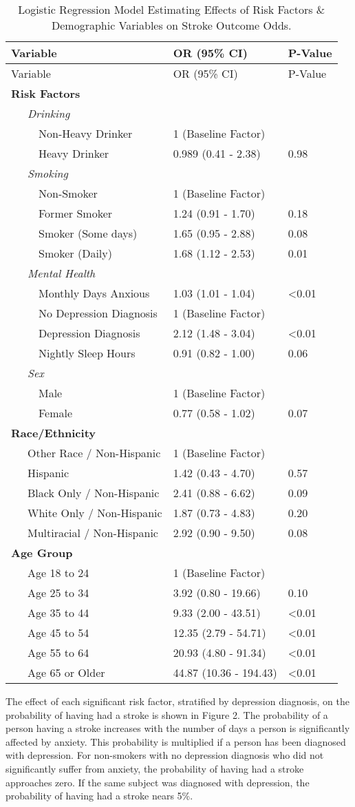 \documentclass[11pt,]{article}
\begin{document}
\begin{longtable}[]{@{}lll@{}}
\caption{Logistic Regression Model Estimating Effects of Risk Factors \&
Demographic Variables on Stroke Outcome Odds.}\tabularnewline
\toprule
Variable & OR (95\% CI) & P-Value\tabularnewline
\midrule
\endfirsthead
\toprule
Variable & OR (95\% CI) & P-Value\tabularnewline
\midrule
\endhead
\textbf{Risk Factors} & &\tabularnewline
~~~\emph{Drinking} & &\tabularnewline
~~~~~Non-Heavy Drinker & 1 (Baseline Factor) &\tabularnewline
~~~~~Heavy Drinker & 0.989 (0.41 - 2.38) & 0.98\tabularnewline
~~~\emph{Smoking} & &\tabularnewline
~~~~~Non-Smoker & 1 (Baseline Factor) &\tabularnewline
~~~~~Former Smoker & 1.24 (0.91 - 1.70) & 0.18\tabularnewline
~~~~~Smoker (Some days) & 1.65 (0.95 - 2.88) & 0.08\tabularnewline
~~~~~Smoker (Daily) & 1.68 (1.12 - 2.53) & 0.01\tabularnewline
~~~\emph{Mental Health} & &\tabularnewline
~~~~~Monthly Days Anxious & 1.03 (1.01 - 1.04) &
\textless{}0.01\tabularnewline
~~~~~No Depression Diagnosis & 1 (Baseline Factor) &\tabularnewline
~~~~~Depression Diagnosis & 2.12 (1.48 - 3.04) &
\textless{}0.01\tabularnewline
~~~~~Nightly Sleep Hours & 0.91 (0.82 - 1.00) & 0.06\tabularnewline
~~~\emph{Sex} & &\tabularnewline
~~~~~Male & 1 (Baseline Factor) &\tabularnewline
~~~~~Female & 0.77 (0.58 - 1.02) & 0.07\tabularnewline
\textbf{Race/Ethnicity} & &\tabularnewline
~~~Other Race / Non-Hispanic & 1 (Baseline Factor) &\tabularnewline
~~~Hispanic & 1.42 (0.43 - 4.70) & 0.57\tabularnewline
~~~Black Only / Non-Hispanic & 2.41 (0.88 - 6.62) & 0.09\tabularnewline
~~~White Only / Non-Hispanic & 1.87 (0.73 - 4.83) & 0.20\tabularnewline
~~~Multiracial / Non-Hispanic & 2.92 (0.90 - 9.50) & 0.08\tabularnewline
\textbf{Age Group} & &\tabularnewline
~~~Age 18 to 24 & 1 (Baseline Factor) &\tabularnewline
~~~Age 25 to 34 & 3.92 (0.80 - 19.66) & 0.10\tabularnewline
~~~Age 35 to 44 & 9.33 (2.00 - 43.51) & \textless{}0.01\tabularnewline
~~~Age 45 to 54 & 12.35 (2.79 - 54.71) & \textless{}0.01\tabularnewline
~~~Age 55 to 64 & 20.93 (4.80 - 91.34) & \textless{}0.01\tabularnewline
~~~Age 65 or Older & 44.87 (10.36 - 194.43) &
\textless{}0.01\tabularnewline
\bottomrule
\end{longtable}

The effect of each significant risk factor, stratified by depression
diagnosis, on the probability of having had a stroke is shown in Figure
2. The probability of a person having a stroke increases with the number
of days a person is significantly affected by anxiety. This probability
is multiplied if a person has been diagnosed with depression. For
non-smokers with no depression diagnosis who did not significantly
suffer from anxiety, the probability of having had a stroke approaches
zero. If the same subject was diagnosed with depression, the probability
of having had a stroke nears 5\%.
\end{document}
